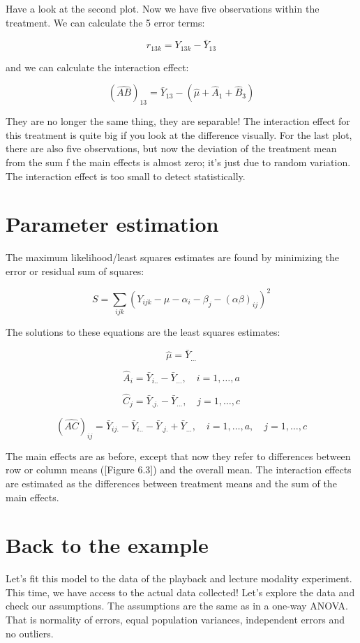 \documentclass[
  letterpaper,
]{book}
\begin{document}
Have a look at the second plot. Now we have five observations within the
treatment. We can calculate the 5 error terms:

\[r_{13k} = Y_{13k} - \bar{Y}_{13}\]

and we can calculate the interaction effect:

\[ (\hat{AB})_{13} = \bar{Y}_{13}- (\hat{\mu} + \hat{A}_1 + \hat{B}_3)\]

They are no longer the same thing, they are separable! The interaction
effect for this treatment is quite big if you look at the difference
visually. For the last plot, there are also five observations, but now
the deviation of the treatment mean from the sum f the main effects is
almost zero; it's just due to random variation. The interaction effect
is too small to detect statistically.

\section{Parameter estimation}\label{parameter-estimation}

The maximum likelihood/least squares estimates are found by minimizing
the error or residual sum of squares:

\[
S = \sum_{ijk} (Y_{ijk} - \mu - \alpha_i - \beta_j - (\alpha\beta)_{ij})^2
\]

The solutions to these equations are the least squares estimates:

\[
\hat{\mu} = \bar{Y}_{...}
\]

\[
\hat{A}_i = \bar{Y}_{i..} - \bar{Y}_{...}, \quad i = 1, \dots, a
\]

\[
\hat{C}_j = \bar{Y}_{.j.} - \bar{Y}_{...}, \quad j = 1, \dots, c
\]

\[
(\hat{AC})_{ij} = \bar{Y}_{ij.} - \bar{Y}_{i..} - \bar{Y}_{.j.} + \bar{Y}_{...}, \quad i = 1, \dots, a, \quad j = 1, \dots,c
\]

The main effects are as before, except that now they refer to
differences between row or column means ({[}Figure 6.3{]}) and the
overall mean. The interaction effects are estimated as the differences
between treatment means and the sum of the main effects.

\section{Back to the example}\label{back-to-the-example}

Let's fit this model to the data of the playback and lecture modality
experiment. This time, we have access to the actual data collected!
Let's explore the data and check our assumptions. The assumptions are
the same as in a one-way ANOVA. That is normality of errors, equal
population variances, independent errors and no outliers.
\end{document}
